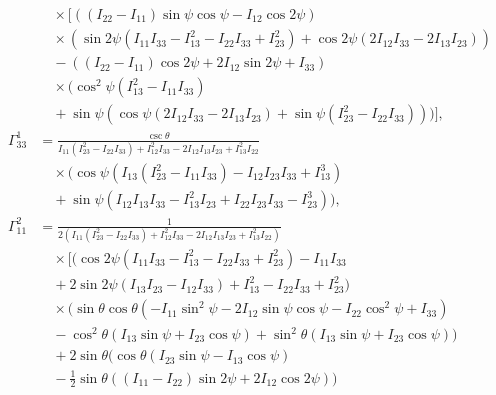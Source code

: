 \documentclass[pdflatex,sn-mathphys-num]{sn-jnl}%
\theoremstyle{thmstyleone}%
\theoremstyle{thmstyletwo}%
\theoremstyle{thmstylethree}%
\begin{document}
\begin{appendices}
\begin{align}
    &\quad \times \bigg[ ((I_{22}-I_{11}) \sin \psi \cos \psi-I_{12} \cos 2\psi) \nonumber \\
    &\quad \times \left(\sin 2\psi \left(I_{11} I_{33}-I_{13}^2-I_{22} I_{33}+I_{23}^2\right)+\cos 2\psi (2 I_{12} I_{33}-2 I_{13} I_{23})\right) \nonumber \\
    &\quad -((I_{22}-I_{11}) \cos 2\psi+2 I_{12} \sin 2\psi+I_{33}) \nonumber \\
    &\quad \times \Big(\cos ^2\psi \left(I_{13}^2-I_{11} I_{33}\right) \nonumber \\
    &\quad +\sin \psi \left(\cos \psi (2 I_{12} I_{33}-2 I_{13} I_{23})+\sin \psi \left(I_{23}^2-I_{22} I_{33}\right)\right)\Big) \bigg], \nonumber \\
    \Gamma^{1}_{33} &= \frac{\csc \theta}{I_{11} \left(I_{23}^2-I_{22} I_{33}\right)+I_{12}^2 I_{33}-2 I_{12} I_{13} I_{23}+I_{13}^2 I_{22}} \nonumber \\
    &\quad \times \Big( \cos \psi \left(I_{13} \left(I_{23}^2-I_{11} I_{33}\right)-I_{12} I_{23} I_{33}+I_{13}^3\right) \nonumber \\
    &\quad +\sin \psi \left(I_{12} I_{13} I_{33}-I_{13}^2 I_{23}+I_{22} I_{23} I_{33}-I_{23}^3\right) \Big), \nonumber \\
    \Gamma^{2}_{11} &= \frac{1}{2 \left(I_{11} \left(I_{23}^2-I_{22} I_{33}\right)+I_{12}^2 I_{33}-2 I_{12} I_{13} I_{23}+I_{13}^2 I_{22}\right)} \nonumber \\
    &\quad \times \bigg[ \Big(\cos 2\psi \left(I_{11} I_{33}-I_{13}^2-I_{22} I_{33}+I_{23}^2\right)-I_{11} I_{33} \nonumber \\
    &\quad +2 \sin 2\psi (I_{13} I_{23}-I_{12} I_{33})+I_{13}^2-I_{22} I_{33}+I_{23}^2\Big) \nonumber \\
    &\quad \times \bigg(\sin \theta \cos \theta \left(-I_{11} \sin ^2\psi-2 I_{12} \sin \psi \cos \psi-I_{22} \cos ^2\psi+I_{33}\right) \nonumber \\
    &\quad -\cos ^2\theta (I_{13} \sin \psi+I_{23} \cos \psi)+\sin ^2\theta (I_{13} \sin \psi+I_{23} \cos \psi)\bigg) \nonumber \\
    &\quad +2 \sin \theta \bigg(\cos \theta (I_{23} \sin \psi-I_{13} \cos \psi) \nonumber \\
    &\quad -\frac{1}{2} \sin \theta ((I_{11}-I_{22}) \sin 2\psi+2 I_{12} \cos 2\psi)\bigg) \nonumber \\

\end{align}
\end{appendices}
\end{document}
